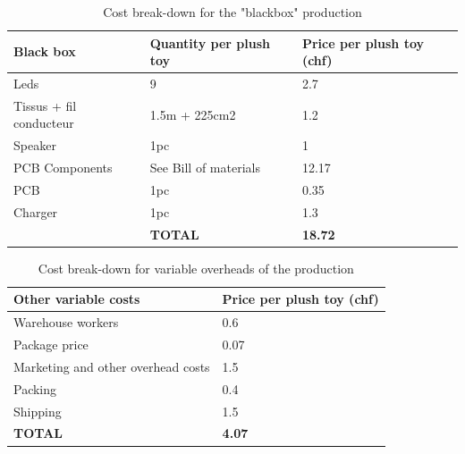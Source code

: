 \begin{table}[]
\centering
\caption{Cost break-down for the "blackbox" production}
\label{tab:cost-blackbox}
\begin{tabular}{l|p{4.5cm}||p{4.5cm}|}
\hline
\multicolumn{1}{|l|}{\textbf{Black box}}      & \textbf{Quantity per plush toy} & \textbf{Price per plush toy (chf)} \\ \hline \hline
\multicolumn{1}{|l|}{Leds}                    & 9                             & 2.7                             \\ \hline
\multicolumn{1}{|l|}{Tissus + fil conducteur} & 1.5m + 225cm2                 & 1.2                              \\ \hline
\multicolumn{1}{|l|}{Speaker}                 & 1pc                           & 1                                \\ \hline
\multicolumn{1}{|l|}{PCB Components}          & See Bill of materials         & 12.17                            \\ \hline
\multicolumn{1}{|l|}{PCB}                     & 1pc                           & 0.35                             \\ \hline
\multicolumn{1}{|l|}{Charger}                 & 1pc                           & 1.3                              \\ \hline
                                              & \textbf{TOTAL}                & \textbf{18.72}                  \\ \cline{2-3} 
\end{tabular}
\end{table}

\begin{table}[]
\centering
\caption{Cost break-down for variable overheads of the production}
\label{tab:cost-extra}
\begin{tabular}{|l|p{4.8cm}|}
\hline
\textbf{Other variable costs}      & \textbf{Price per plush toy (chf)} \\ \hline \hline
Warehouse workers                  & 0.6                                \\ \hline
Package price                      & 0.07                               \\ \hline
Marketing and other overhead costs & 1.5                                \\ \hline
Packing                            & 0.4                                \\ \hline
Shipping                           & 1.5                                \\ \hline
\textbf{TOTAL}                     & \textbf{4.07}                      \\ \hline
\end{tabular}
\end{table}

